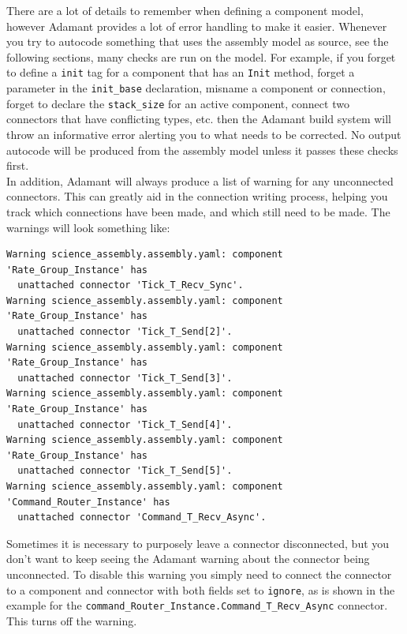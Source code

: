 There are a lot of details to remember when defining a component model, however Adamant provides a lot of error handling to make it easier. Whenever you try to autocode something that uses the assembly model as source, see the following sections, many checks are run on the model. For example, if you forget to define a \texttt{init} tag for a component that has an \texttt{Init} method, forget a parameter in the \texttt{init\_base} declaration, misname a component or connection, forget to declare the \texttt{stack\_size} for an active component, connect two connectors that have conflicting types, etc. then the Adamant build system will throw an informative error alerting you to what needs to be corrected. No output autocode will be produced from the assembly model unless it passes these checks first. \\

In addition, Adamant will always produce a list of warning for any unconnected connectors. This can greatly aid in the connection writing process, helping you track which connections have been made, and which still need to be made. The warnings will look something like:

\vspace{5mm} %
\begin{verbatim}
Warning science_assembly.assembly.yaml: component 'Rate_Group_Instance' has 
  unattached connector 'Tick_T_Recv_Sync'.
Warning science_assembly.assembly.yaml: component 'Rate_Group_Instance' has 
  unattached connector 'Tick_T_Send[2]'.
Warning science_assembly.assembly.yaml: component 'Rate_Group_Instance' has 
  unattached connector 'Tick_T_Send[3]'.
Warning science_assembly.assembly.yaml: component 'Rate_Group_Instance' has 
  unattached connector 'Tick_T_Send[4]'.
Warning science_assembly.assembly.yaml: component 'Rate_Group_Instance' has 
  unattached connector 'Tick_T_Send[5]'.
Warning science_assembly.assembly.yaml: component 'Command_Router_Instance' has 
  unattached connector 'Command_T_Recv_Async'.
\end{verbatim}
\vspace{5mm} %

Sometimes it is necessary to purposely leave a connector disconnected, but you don't want to keep seeing the Adamant warning about the connector being unconnected. To disable this warning you simply need to connect the connector to a component and connector with both fields set to \texttt{ignore}, as is shown in the example for the \texttt{command\_Router\_Instance.Command\_T\_Recv\_Async} connector. This turns off the warning. \\

